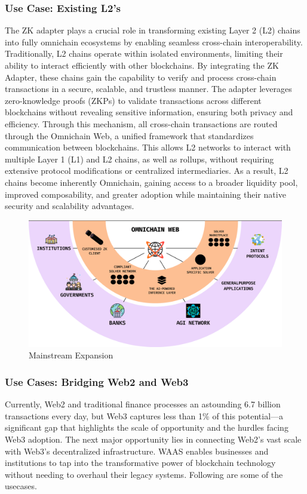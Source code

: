 \subsubsection{Use Case: Existing L2's}
The ZK adapter plays a crucial role in transforming existing Layer 2 (L2) chains into fully omnichain ecosystems by enabling seamless cross-chain interoperability. Traditionally, L2 chains operate within isolated environments, limiting their ability to interact efficiently with other blockchains. By integrating the ZK Adapter, these chains gain the capability to verify and process cross-chain transactions in a secure, scalable, and trustless manner. The adapter leverages zero-knowledge proofs (ZKPs) to validate transactions across different blockchains without revealing sensitive information, ensuring both privacy and efficiency. Through this mechanism, all cross-chain transactions are routed through the Omnichain Web, a unified framework that standardizes communication between blockchains. This allows L2 networks to interact with multiple Layer 1 (L1) and L2 chains, as well as rollups, without requiring extensive protocol modifications or centralized intermediaries. As a result, L2 chains become inherently Omnichain, gaining access to a broader liquidity pool, improved composability, and greater adoption while maintaining their native security and scalability advantages.

\begin{figure}[h]
    \centering
    \includegraphics[width=0.9\linewidth]{figure/future.png}
    \caption{Mainstream Expansion}
    \label{fig:solver}
\end{figure}

\subsubsection{Use Cases: Bridging Web2 and Web3}

Currently, Web2 and traditional finance processes an astounding 6.7 billion transactions every day, but Web3 captures less than 1\% of this potential—a significant gap that highlights the scale of opportunity and the hurdles facing Web3 adoption. The next major opportunity lies in connecting Web2's vast scale with Web3's decentralized infrastructure. WAAS enables businesses and institutions to tap into the transformative power of blockchain technology without needing to overhaul their legacy systems. Following are some of the usecases.
 
